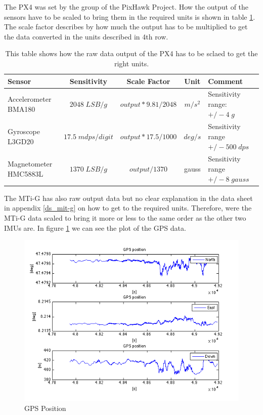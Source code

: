 The PX4 was set by the group of the PixHawk Project. How the output of the sensors have to be scaled to bring them in the required units is shown in table \ref{ct_units_PX4}. The scale factor describes by how much the output has to be multiplied to get the data converted in the units described in 4th row.
\begin{table}[h]
\centering
\begin{tabular}{|p{2.5 cm}|c|c|c|p{3 cm}|}
 \hline
 Sensor & Sensitivity & Scale Factor & Unit & Comment \\
 \hline
 Accelerometer BMA180 & $2048\;LSB/g$ & $output*9.81/2048$ & $m/s^2$ &     Sensitivity range: $+/- 4\;g$ \\
 \hline
 Gyroscope L3GD20 & $17.5\;mdps/digit$ & $output*17.5/1000$ & $deg/s$ &  Sensitivity range $+/- 500\;dps$ \\
 \hline
 Magnetometer HMC5883L & $1370\;LSB/g$ & $output/1370$ & gauss &   Sensitivity range $+/-8\;gauss$\\
\hline
\end {tabular}
\caption{This table shows how the raw data output of the PX4 has to be sclaed to get the right units.}
\label{ct_units_PX4}
\end{table}
The MTi-G has also raw output data but no clear explanation in the data sheet in appendix \ref{ds_mit-g} on how to get to the required units. Therefore, were the MTi-G data scaled to bring it more or less to the same order as the other two IMUs are.
In figure \ref{ct_pos} we can see the plot of the GPS data.
\begin{figure}[hb]
\begin{center}
\includegraphics[width=1\textwidth]{pictures/ct_pos.png}
\caption{GPS Position}
\label{ct_pos}
\end{center}
\end{figure}
